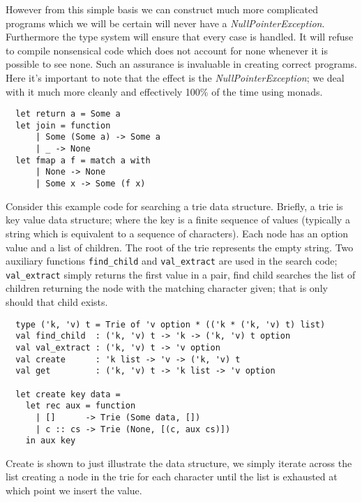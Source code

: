 However from this simple basis we can construct much more complicated programs which we
will be certain will never have a \textit{NullPointerException}.
Furthermore the type system will ensure that every case is handled.
It will refuse to compile nonsensical code
which does not account for none whenever it is possible to see none.
Such an assurance is invaluable in creating correct programs.
Here it's important to note that the effect is the \textit{NullPointerException};
we deal with it much more cleanly and effectively 100\% of the time using monads.

\begin{verbatim}
  let return a = Some a
  let join = function
      | Some (Some a) -> Some a
      | _ -> None
  let fmap a f = match a with
      | None -> None
      | Some x -> Some (f x)
\end{verbatim}

Consider this example code for searching a trie data structure.
Briefly, a trie is key value data structure;
where the key is a finite sequence of values
(typically a string which is equivalent to a sequence of characters).
Each node has an option value and a list of children.
The root of the trie represents the empty string.
Two auxiliary functions \texttt{find\_child} and \texttt{val\_extract}
are used in the search code; \texttt{val\_extract}
simply returns the first value in a pair,
find child searches the list of children returning
the node with the matching character given;
that is only should that child exists.

\begin{verbatim}
  type ('k, 'v) t = Trie of 'v option * (('k * ('k, 'v) t) list)
  val find_child  : ('k, 'v) t -> 'k -> ('k, 'v) t option
  val val_extract : ('k, 'v) t -> 'v option
  val create      : 'k list -> 'v -> ('k, 'v) t
  val get         : ('k, 'v) t -> 'k list -> 'v option

  let create key data =
    let rec aux = function
      | []      -> Trie (Some data, [])
      | c :: cs -> Trie (None, [(c, aux cs)])
    in aux key
\end{verbatim}

Create is shown to just illustrate the data structure,
we simply iterate across the list creating a node in the trie for each character
until the list is exhausted at which point we insert the value.

